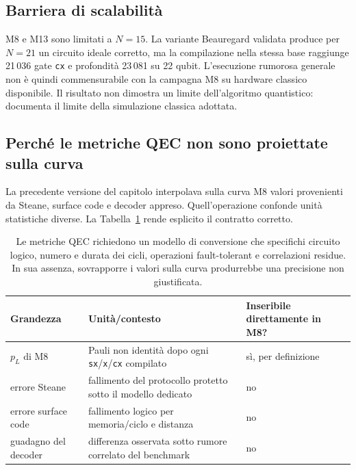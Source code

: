 \begin{onehalfspace}
\subsection*{Barriera di scalabilit\`a}

M8 e M13 sono limitati a $N=15$. La variante Beauregard validata produce per $N=21$ un circuito ideale corretto, ma la compilazione nella stessa base raggiunge 21\,036 gate \texttt{cx} e profondit\`a 23\,081 su 22 qubit. L'esecuzione rumorosa generale non \`e quindi commensurabile con la campagna M8 su hardware classico disponibile. Il risultato non dimostra un limite dell'algoritmo quantistico: documenta il limite della simulazione classica adottata.

\subsection*{Perch\'e le metriche QEC non sono proiettate sulla curva}

La precedente versione del capitolo interpolava sulla curva M8 valori provenienti da Steane, surface code e decoder appreso. Quell'operazione confonde unit\`a statistiche diverse. La Tabella~\ref{tab:decoder_su_shor} rende esplicito il contratto corretto.

\begin{table}[H]
\centering
\small
\begin{tabular}{p{}p{}p{}}
\toprule
\textbf{Grandezza} & \textbf{Unit\`a/contesto} & \textbf{Inseribile direttamente in M8?} \\
\midrule
$p_L$ di M8 & Pauli non identit\`a dopo ogni \texttt{sx}/\texttt{x}/\texttt{cx} compilato & s\`i, per definizione \\
errore Steane & fallimento del protocollo protetto sotto il modello dedicato & no \\
errore surface code & fallimento logico per memoria/ciclo e distanza & no \\
guadagno del decoder & differenza osservata sotto rumore correlato del benchmark & no \\
\bottomrule
\end{tabular}
\caption[Contratto tra risultati QEC e curva M8]{Le metriche QEC richiedono un modello di conversione che specifichi circuito logico, numero e durata dei cicli, operazioni fault-tolerant e correlazioni residue. In sua assenza, sovrapporre i valori sulla curva produrrebbe una precisione non giustificata.}
\label{tab:decoder_su_shor}
\end{table}


\end{onehalfspace}
